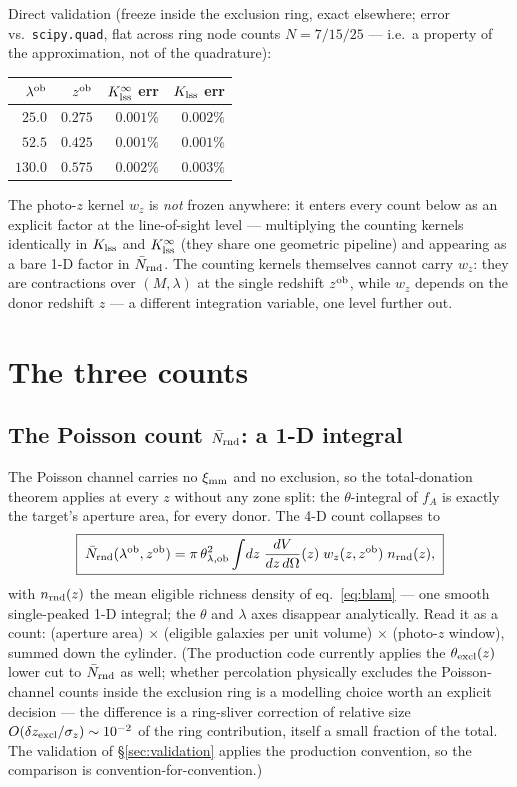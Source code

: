 \documentclass[a4paper, 11pt]{article}
\newcommand{\lob}{\lambda^{\rm ob}}
\newcommand{\zob}{z^{\rm ob}}
\newcommand{\ximm}{\xi_{\rm mm}}
\newcommand{\nrnd}{n_{\rm rnd}}
\newcommand{\Nbar}{\bar{N}_{\rm rnd}}
\newcommand{\Klss}{K_{\rm lss}}
\newcommand{\KlssInf}{K_{\rm lss}^{\infty}}
\newcommand{\thob}{\theta_{\lambda,{\rm ob}}}
\begin{document}
Direct validation (freeze inside the exclusion ring, exact
elsewhere; error vs.\ \texttt{scipy.quad}, flat across ring node
counts $N=7/15/25$ --- i.e.\ a property of the approximation, not
of the quadrature):
\begin{center}
\small
\begin{tabular}{r r r r}
\toprule
$\lob$ & $\zob$ & $\KlssInf$ err & $\Klss$ err \\
\midrule
$25.0$  & $0.275$ & $0.001\%$ & $0.002\%$ \\
$52.5$  & $0.425$ & $0.001\%$ & $0.001\%$ \\
$130.0$ & $0.575$ & $0.002\%$ & $0.003\%$ \\
\bottomrule
\end{tabular}
\end{center}
The photo-$z$ kernel $w_z$ is \emph{not} frozen anywhere: it
enters every count below as an explicit factor at the
line-of-sight level --- multiplying the counting kernels
identically in $\Klss$ and $\KlssInf$ (they share one geometric
pipeline) and appearing as a bare 1-D factor in $\Nbar$. The
counting kernels themselves cannot carry $w_z$: they are
contractions over $(M,\lambda)$ at the single redshift $\zob$,
while $w_z$ depends on the donor redshift $z$ --- a different
integration variable, one level further out.

\section{The three counts}
\label{sec:counts}

\subsection{The Poisson count \texorpdfstring{$\Nbar$}{Nbar}: a 1-D integral}
\label{sec:P1}

The Poisson channel carries no $\ximm$ and no exclusion, so the
total-donation theorem applies at every $z$ without any zone
split: the $\theta$-integral of $f_A$ is exactly the target's
aperture area, for every donor. The 4-D count collapses to
\begin{equation}
\boxed{\;
\Nbar(\lob,\zob)
= \pi\,\thob^2
\int\!dz\;\frac{dV}{dz\,d\Omega}(z)\; w_z(z,\zob)\;
\nrnd(z),
\;}
\label{eq:P1_1d}
\end{equation}
with $\nrnd(z)$ the mean eligible richness density of
eq.~\eqref{eq:blam} --- one smooth single-peaked 1-D integral;
the $\theta$ and $\lambda$ axes disappear analytically. Read it
as a count: (aperture area) $\times$ (eligible galaxies per unit
volume) $\times$ (photo-$z$ window), summed down the cylinder.
(The production code currently applies the $\theta_{\rm excl}(z)$
lower cut to $\Nbar$ as well; whether percolation physically
excludes the Poisson-channel counts inside the exclusion ring is
a modelling choice worth an explicit decision --- the difference
is a ring-sliver correction of relative size
$O(\delta z_{\rm excl}/\sigma_z)\sim 10^{-2}$ of the ring
contribution, itself a small fraction of the total. The
validation of \S\ref{sec:validation} applies the production
convention, so the comparison is convention-for-convention.)
\end{document}
